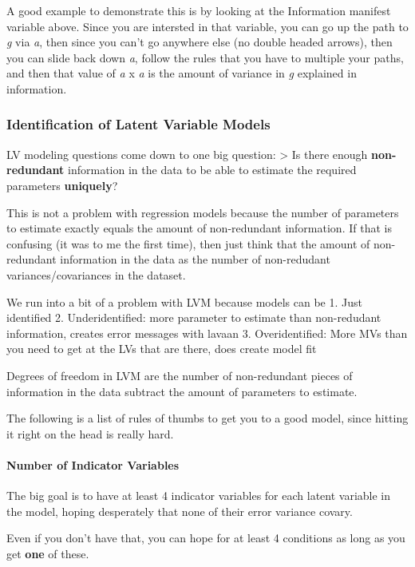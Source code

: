 \documentclass[]{book}
\let\oldparagraph\paragraph
\renewcommand{\paragraph}[1]{\oldparagraph{#1}\mbox{}}
\theoremstyle{definition}
\theoremstyle{definition}
\theoremstyle{definition}
\theoremstyle{remark}
\begin{document}
A good example to demonstrate this is by looking at the Information
manifest variable above. Since you are intersted in that variable, you
can go up the path to \emph{g} via \emph{a}, then since you can't go
anywhere else (no double headed arrows), then you can slide back down
\emph{a}, follow the rules that you have to multiple your paths, and
then that value of \emph{a} x \emph{a} is the amount of variance in
\emph{g} explained in information.

\subsubsection{Identification of Latent Variable
Models}\label{identification-of-latent-variable-models}

LV modeling questions come down to one big question: \textgreater{} Is
there enough \textbf{non-redundant} information in the data to be able
to estimate the required parameters \textbf{uniquely}?

This is not a problem with regression models because the number of
parameters to estimate exactly equals the amount of non-redundant
information. If that is confusing (it was to me the first time), then
just think that the amount of non-redundant information in the data as
the number of non-redudant variances/covariances in the dataset.

We run into a bit of a problem with LVM because models can be 1. Just
identified 2. Underidentified: more parameter to estimate than
non-redudant information, creates error messages with lavaan 3.
Overidentified: More MVs than you need to get at the LVs that are there,
does create model fit

Degrees of freedom in LVM are the number of non-redundant pieces of
information in the data subtract the amount of parameters to estimate.

The following is a list of rules of thumbs to get you to a good model,
since hitting it right on the head is really hard.

\paragraph{Number of Indicator
Variables}\label{number-of-indicator-variables}

The big goal is to have at least 4 indicator variables for each latent
variable in the model, hoping desperately that none of their error
variance covary.

Even if you don't have that, you can hope for at least 4 conditions as
long as you get \textbf{one} of these.
\end{document}
